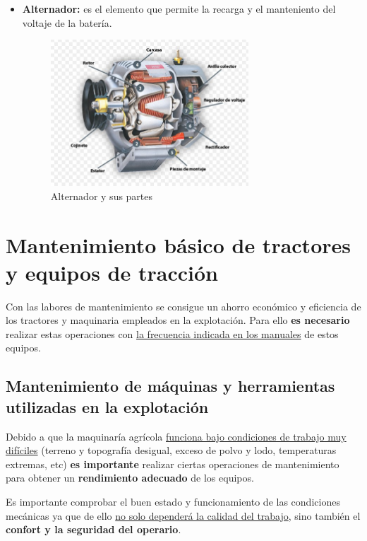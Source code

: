 \documentclass[a4paper,12pt,oneside]{book}
\begin{document}
\begin{itemize}
\item \textbf{Alternador:} es el elemento que permite la recarga y el manteniento del
voltaje de la batería.

\begin{figure}[!ht]
\centering
\includegraphics[width=0.7\textwidth]{./img_0009/alternador.jpg}
\caption{Alternador y sus partes}
\end{figure}
\end{itemize}

\chapter{Mantenimiento básico de tractores y equipos de tracción}
\label{sec:org8b2b343}

Con las labores de mantenimiento se consigue un ahorro económico y eficiencia de
los tractores y maquinaria empleados en la explotación. Para ello \textbf{es necesario}
realizar estas operaciones con \uline{la frecuencia indicada en los manuales} de estos
equipos. 

\section{Mantenimiento de máquinas y herramientas utilizadas en la explotación}
\label{sec:org0dfc19c}
Debido a que la maquinaría agrícola \uline{funciona bajo condiciones de trabajo muy
difíciles} (terreno y topografía desigual, exceso de polvo y lodo, temperaturas
extremas, etc) \textbf{es importante} realizar ciertas operaciones de mantenimiento
para obtener un \textbf{rendimiento adecuado} de los equipos.

Es importante comprobar el buen estado y funcionamiento de las condiciones
mecánicas ya que de ello \uline{no solo dependerá la calidad del trabajo}, sino
también el \textbf{confort y la seguridad del operario}.
\end{document}
